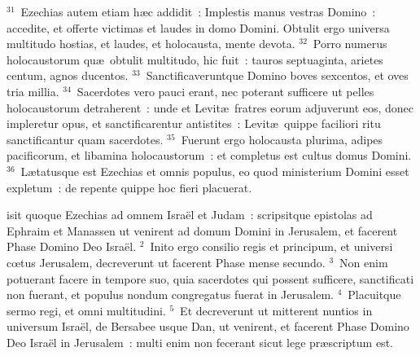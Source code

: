 ${}^{31}$~Ezechias autem etiam h\ae c addidit~: Implestis manus vestras Domino~: accedite, et offerte victimas et laudes in domo Domini. Obtulit ergo universa multitudo hostias, et laudes, et holocausta, mente devota.
${}^{32}$~Porro numerus holocaustorum qu\ae\ obtulit multitudo, hic fuit~: tauros septuaginta, arietes centum, agnos ducentos.
${}^{33}$~Sanctificaveruntque Domino boves sexcentos, et oves tria millia.
${}^{34}$~Sacerdotes vero pauci erant, nec poterant sufficere ut pelles holocaustorum detraherent~: unde et Levit\ae\ fratres eorum adjuverunt eos, donec impleretur opus, et sanctificarentur antistites~: Levit\ae\ quippe faciliori ritu sanctificantur quam sacerdotes.
${}^{35}$~Fuerunt ergo holocausta plurima, adipes pacificorum, et libamina holocaustorum~: et completus est cultus domus Domini.
${}^{36}$~L\ae tatusque est Ezechias et omnis populus, eo quod ministerium Domini esset expletum~: de repente quippe hoc fieri placuerat.

\bchapter
{}isit quoque Ezechias ad omnem Isra\"el et Judam~: scripsitque epistolas ad Ephraim et Manassen ut venirent ad domum Domini in Jerusalem, et facerent Phase Domino Deo Isra\"el.
${}^{2}$~Inito ergo consilio regis et principum, et universi cœtus Jerusalem, decreverunt ut facerent Phase mense secundo.
${}^{3}$~Non enim potuerant facere in tempore suo, quia sacerdotes qui possent sufficere, sanctificati non fuerant, et populus nondum congregatus fuerat in Jerusalem.
${}^{4}$~Placuitque sermo regi, et omni multitudini.
${}^{5}$~Et decreverunt ut mitterent nuntios in universum Isra\"el, de Bersabee usque Dan, ut venirent, et facerent Phase Domino Deo Isra\"el in Jerusalem~: multi enim non fecerant sicut lege pr\ae scriptum est.


